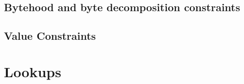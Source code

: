 \subsection{Bytehood and byte decomposition constraints}    \label{block data: byte decomposition}    
\subsection{Value Constraints}                              \label{block data: value constraints}     

\section{Lookups}                                           \label{block data: lookups}               

	
